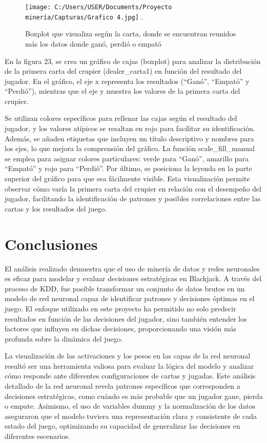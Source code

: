 \documentclass[conference,final,]{IEEEtran}
\begin{document}
\begin{figure}[htbp]
\centering
\texttt{[image: C:/Users/USER/Documents/Proyecto minería/Capturas/Grafico 4.jpg]}
\DeclareGraphicsExtensions.
\caption{Boxplot que visualiza según la carta, donde se encuentran reunidos más los datos donde ganó, perdió o empató}
\label{Dataset 11}
\end{figure}

En la figura 23, se crea un gráfico de cajas (boxplot) para analizar la
distribución de la primera carta del crupier (dealer\_carta1) en función
del resultado del jugador. En el gráfico, el eje x representa los
resultados (``Ganó'', ``Empató'' y ``Perdió''), mientras que el eje y
muestra los valores de la primera carta del crupier.

Se utilizan colores específicos para rellenar las cajas según el
resultado del jugador, y los valores atípicos se resaltan en rojo para
facilitar su identificación. Además, se añaden etiquetas que incluyen un
título descriptivo y nombres para los ejes, lo que mejora la comprensión
del gráfico. La función scale\_fill\_manual se emplea para asignar
colores particulares: verde para ``Ganó'', amarillo para ``Empató'' y
rojo para ``Perdió''. Por último, se posiciona la leyenda en la parte
superior del gráfico para que sea fácilmente visible. Esta visualización
permite observar cómo varía la primera carta del crupier en relación con
el desempeño del jugador, facilitando la identificación de patrones y
posibles correlaciones entre las cartas y los resultados del juego.

\section{Conclusiones}\label{conclusiones}

El análisis realizado demuestra que el uso de minería de datos y redes
neuronales es eficaz para modelar y evaluar decisiones estratégicas en
Blackjack. A través del proceso de KDD, fue posible transformar un
conjunto de datos brutos en un modelo de red neuronal capaz de
identificar patrones y decisiones óptimas en el juego. El enfoque
utilizado en este proyecto ha permitido no solo predecir resultados en
función de las decisiones del jugador, sino también entender los
factores que influyen en dichas decisiones, proporcionando una visión
más profunda sobre la dinámica del juego.

La visualización de las activaciones y los pesos en las capas de la red
neuronal resultó ser una herramienta valiosa para evaluar la lógica del
modelo y analizar cómo responde ante diferentes configuraciones de
cartas y jugadas. Este análisis detallado de la red neuronal revela
patrones específicos que corresponden a decisiones estratégicas, como
cuándo es más probable que un jugador gane, pierda o empate. Asimismo,
el uso de variables dummy y la normalización de los datos aseguraron que
el modelo tuviera una representación clara y consistente de cada estado
del juego, optimizando su capacidad de generalizar las decisiones en
diferentes escenarios.
\end{document}

